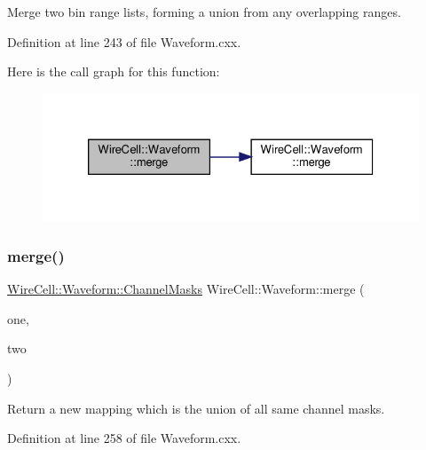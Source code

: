 Merge two bin range lists, forming a union from any overlapping ranges. 



Definition at line 243 of file Waveform.\+cxx.

Here is the call graph for this function\+:
\nopagebreak
\begin{figure}[H]
\begin{center}
\leavevmode
\includegraphics[width=326pt]{namespace_wire_cell_1_1_waveform_af5a11c1c84f74aa42aedcc16029cb1c7_cgraph}
\end{center}
\end{figure}
\mbox{\label{namespace_wire_cell_1_1_waveform_a49c3b64d64db947f08b1eedcf4c47772}} 
\subsubsection{\texorpdfstring{merge()}{merge()}\hspace{0.1cm}{\footnotesize\ttfamily [3/4]}}
{\footnotesize\ttfamily \hyperlink{namespace_wire_cell_1_1_waveform_a3d2f1baf84b749d139533ebd4d4da3f0}{Wire\+Cell\+::\+Waveform\+::\+Channel\+Masks} Wire\+Cell\+::\+Waveform\+::merge (\begin{DoxyParamCaption}\item[{const \hyperlink{namespace_wire_cell_1_1_waveform_a3d2f1baf84b749d139533ebd4d4da3f0}{Channel\+Masks} \&}]{one,  }\item[{const \hyperlink{namespace_wire_cell_1_1_waveform_a3d2f1baf84b749d139533ebd4d4da3f0}{Channel\+Masks} \&}]{two }\end{DoxyParamCaption})}



Return a new mapping which is the union of all same channel masks. 



Definition at line 258 of file Waveform.\+cxx.

